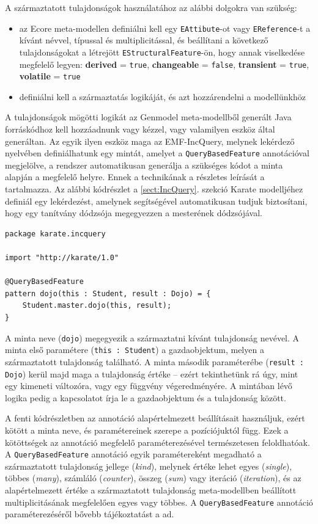 A származtatott tulajdonságok használatához az alábbi dolgokra van szükség:
\begin{itemize}
    \item az Ecore meta-modellen definiálni kell egy \texttt{EAttibute}-ot vagy \texttt{EReference}-t a kívánt névvel, típussal és multiplicitással, és beállítani a következő tulajdonságokat a létrejött \texttt{EStructuralFeature}-ön, hogy annak viselkedése megfelelő legyen: \textbf{derived} = \texttt{true}, \textbf{changeable} = \texttt{false}, \textbf{transient} = \texttt{true}, \textbf{volatile} = \texttt{true}
    \item definiálni kell a származtatás logikáját, és azt hozzárendelni a modellünkhöz
\end{itemize}
A tulajdonságok mögötti logikát az Genmodel meta-modellből generált Java forráskódhoz kell hozzáadnunk vagy kézzel, vagy valamilyen eszköz által generáltan.
Az egyik ilyen eszköz maga az EMF-IncQuery, melynek lekérdező nyelvében definiálhatunk egy mintát, amelyet a \texttt{QueryBasedFeature} annotációval megjelölve, a rendszer automatikusan generálja a szükséges kódot a minta alapján a megfelelő helyre. 
Ennek a technikának a részletes leírását a \cite{DerivedFeature} tartalmazza.
Az alábbi kódrészlet a \ref{sect:IncQuery}. szekció Karate modelljéhez definiál egy lekérdezést, amelynek segítségével automatikusan tudjuk biztosítani, hogy egy tanítvány dódzsója megegyezzen a mesterének dódzsójával.
%
\begin{lstlisting}
package karate.incquery

import "http://karate/1.0"

@QueryBasedFeature
pattern dojo(this : Student, result : Dojo) = {
    Student.master.dojo(this, result);
}
\end{lstlisting}
%
A minta neve (\texttt{dojo}) megegyezik a származtatni kívánt tulajdonság nevével.
A minta első paramétere (\texttt{this : Student}) a gazdaobjektum, melyen a származtatott tulajdonság található.
A minta második paraméterébe (\texttt{result : Dojo}) kerül majd maga a tulajdonság értéke -- ezért tekinthetünk rá úgy, mint egy kimeneti változóra, vagy egy függvény végeredményére.
A mintában lévő logika pedig a kapcsolatot írja le a gazdaobjektum és a tulajdonság között.

A fenti kódrészletben az annotáció alapértelmezett beállításait használjuk, ezért kötött a minta neve, és paramétereinek szerepe a pozíciójuktól függ.
Ezek a kötöttségek az annotáció megfelelő paraméterezésével természetesen feloldhatóak.
A \texttt{QueryBasedFeature} annotáció egyik paramétereként megadható a származtatott tulajdonság jellege (\emph{kind}), melynek értéke lehet egyes (\emph{single}), többes (\emph{many}), számláló (\emph{counter}), összeg (\emph{sum}) vagy iteráció (\emph{iteration}), és az alapértelmezett értéke a származtatott tulajdonság meta-modellben beállított multiplicitásának megfelelően egyes vagy többes.
A \texttt{QueryBasedFeature} annotáció paraméterezéséről bővebb tájékoztatást a \cite{DerivedFeature} ad.

